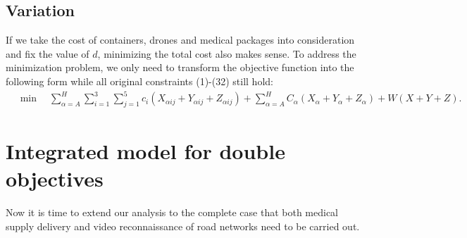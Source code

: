 \documentclass{mcmthesis}
\begin{document}
\subsection{Variation}

\noindent If we take the cost of containers, drones and medical packages into consideration and fix the value of $d$, minimizing the total cost also makes sense. To address the minimization problem, we only need to transform the objective function into the following form while all original constraints (1)-(32) still hold:
\[
\begin{aligned}
&\min\quad\sum_{\alpha=A}^{H}\sum_{i=1}^{3}\sum_{j=1}^{5}c_{i}\left(X_{\alpha ij}+Y_{\alpha ij}+Z_{\alpha ij}\right)
+\sum_{\alpha=A}^{H}C_{{\alpha}}\left(X_{\alpha}+Y_{\alpha }+Z_{\alpha }\right)+W(X+Y+Z).
\end{aligned}
\]



\section{Integrated model for double objectives}
Now it is time to extend our analysis to the complete case that both medical supply delivery and video reconnaissance of road networks need to be carried out.
\end{document}

